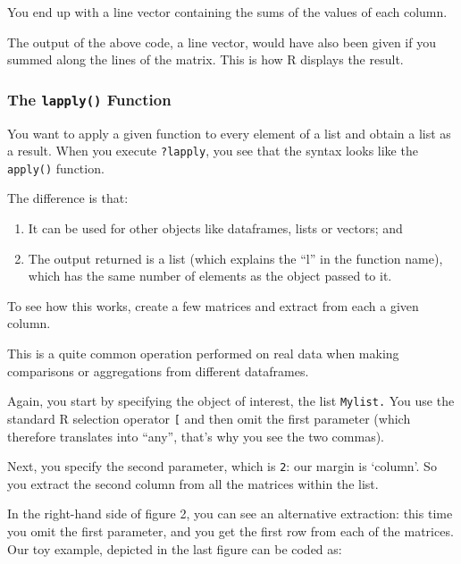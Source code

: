 \documentclass[
]{book}
\providecommand{\tightlist}{%
  \setlength{\itemsep}{0pt}\setlength{\parskip}{0pt}}
\begin{document}
You end up with a line vector containing the sums of the values of each column.

The output of the above code, a line vector, would have also been given if you summed along the lines of the matrix. This is how R displays the result.

\hypertarget{the-lapply-function}{%
\subsubsection{\texorpdfstring{The \texttt{lapply()} Function}{The lapply() Function}}\label{the-lapply-function}}

You want to apply a given function to every element of a list and obtain a list as a result. When you execute \texttt{?lapply}, you see that the syntax looks like the \texttt{apply()} function.

The difference is that:

\begin{enumerate}
\def\labelenumi{\arabic{enumi}.}
\tightlist
\item
  It can be used for other objects like dataframes, lists or vectors; and
\item
  The output returned is a list (which explains the ``l'' in the function name), which has the same number of elements as the object passed to it.
\end{enumerate}

To see how this works, create a few matrices and extract from each a given column.

This is a quite common operation performed on real data when making comparisons or aggregations from different dataframes.

Again, you start by specifying the object of interest, the list \texttt{Mylist.} You use the standard R selection operator \texttt{{[}} and then omit the first parameter (which therefore translates into ``any'', that's why you see the two commas).

Next, you specify the second parameter, which is \texttt{2}: our margin is `column'. So you extract the second column from all the matrices within the list.

In the right-hand side of figure 2, you can see an alternative extraction: this time you omit the first parameter, and you get the first row from each of the matrices. Our toy example, depicted in the last figure can be coded as:
\end{document}
